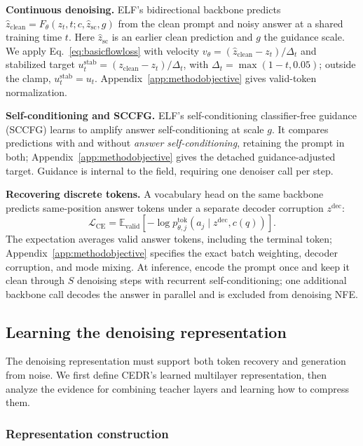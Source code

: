 \documentclass[11pt,letterpaper]{article}
\newcommand{\E}{\mathbb{E}}
\begin{document}
\textbf{Continuous denoising.}
ELF's bidirectional backbone predicts $\widehat z_{\mathrm{clean}}=F_\theta(z_t,t;c,\widehat z_{\mathrm{sc}},g)$ from the clean prompt and noisy answer at a shared training time $t$. Here $\widehat z_{\mathrm{sc}}$ is an earlier clean prediction and $g$ the guidance scale. We apply Eq.~\eqref{eq:basicflowloss} with velocity $v_\theta=(\widehat z_{\mathrm{clean}}-z_t)/\Delta_t$ and stabilized target $u_t^{\mathrm{stab}}=(z_{\mathrm{clean}}-z_t)/\Delta_t$, with $\Delta_t=\max(1-t,0.05)$; outside the clamp, $u_t^{\mathrm{stab}}=u_t$. Appendix~\ref{app:methodobjective} gives valid-token normalization.

\textbf{Self-conditioning and SCCFG.}
ELF's self-conditioning classifier-free guidance (SCCFG) learns to amplify answer self-conditioning at scale $g$. It compares predictions with and without \emph{answer self-conditioning}, retaining the prompt in both; Appendix~\ref{app:methodobjective} gives the detached guidance-adjusted target. Guidance is internal to the field, requiring one denoiser call per step.

\textbf{Recovering discrete tokens.}
A vocabulary head on the same backbone predicts same-position answer tokens under a separate decoder corruption $z^{\mathrm{dec}}$:
\begin{equation}
 \mathcal L_{\mathrm{CE}}
 =\E_{\mathrm{valid}}\!\left[-\log p_{\theta,j}^{\mathrm{tok}}(a_j\mid z^{\mathrm{dec}},c(q))\right].
 \label{eq:methoddecoderloss}
\end{equation}
The expectation averages valid answer tokens, including the terminal token; Appendix~\ref{app:methodobjective} specifies the exact batch weighting, decoder corruption, and mode mixing. At inference, encode the prompt once and keep it clean through $S$ denoising steps with recurrent self-conditioning; one additional backbone call decodes the answer in parallel and is excluded from denoising NFE.

\subsection{Learning the denoising representation}
\label{sec:representation}

The denoising representation must support both token recovery and generation from noise. We first define CEDR's learned multilayer representation, then analyze the evidence for combining teacher layers and learning how to compress them.

\subsubsection{Representation construction}
\label{sec:representationconstruction}
\end{document}
